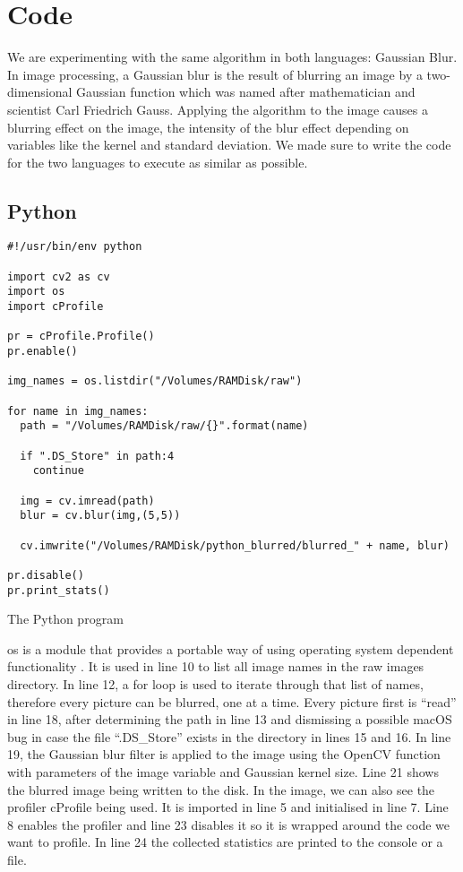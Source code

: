 \section{Code}
We are experimenting with the same algorithm in both languages: Gaussian Blur. In image processing, a Gaussian blur is the result of blurring an image by a two-dimensional Gaussian function which was named after mathematician and scientist Carl Friedrich Gauss. Applying the algorithm to the image causes a blurring effect on the image, the intensity of the blur effect depending on variables like the kernel and standard deviation. We made sure to write the code for the two languages to execute as similar as possible.

\subsection{Python}


\begin{listing}[!ht]
\begin{verbatim}
#!/usr/bin/env python

import cv2 as cv
import os
import cProfile

pr = cProfile.Profile()
pr.enable()

img_names = os.listdir("/Volumes/RAMDisk/raw")

for name in img_names:
  path = "/Volumes/RAMDisk/raw/{}".format(name)

  if ".DS_Store" in path:4
    continue

  img = cv.imread(path)
  blur = cv.blur(img,(5,5))

  cv.imwrite("/Volumes/RAMDisk/python_blurred/blurred_" + name, blur)

pr.disable()
pr.print_stats()
\end{verbatim}
\caption{The Python program}
\label{listing:python}
\end{listing}

os is a module that provides a portable way of using operating system dependent functionality \cite{os}. It is used in line 10 to list all image names in the raw images directory. In line 12, a for loop is used to iterate through that list of names, therefore every picture can be blurred, one at a time. Every picture first is “read” in line 18, after determining the path in line 13 and dismissing a possible macOS bug in case the file “.DS\_Store” exists in the directory in lines 15 and 16. In line 19, the Gaussian blur filter is applied to the image using the OpenCV function with parameters of the image variable and Gaussian kernel size. Line 21 shows the blurred image being written to the disk.
In the image, we can also see the profiler cProfile being used. It is imported in line 5 and initialised in line 7. Line 8 enables the profiler and line 23 disables it so it is wrapped around the code we want to profile. In line 24 the collected statistics are printed to the console or a file.

